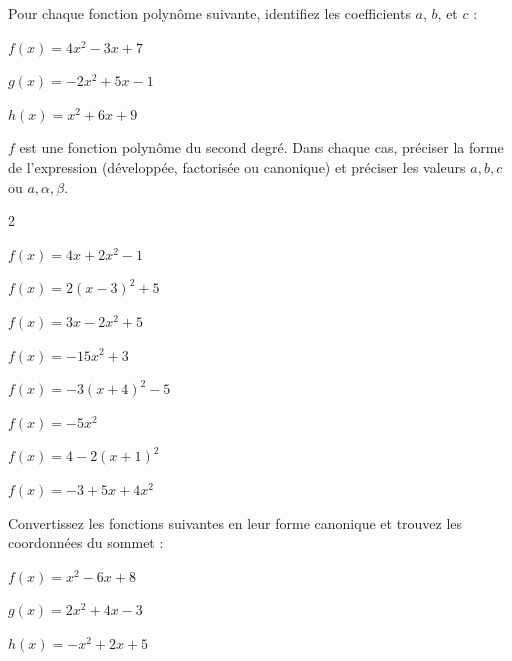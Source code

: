 \documentclass[11pt,a4paper]{article}  %
\begin{document}
	\graphicspath{{images/}}
	
	\begin{center}
		
		
	\end{center}



Pour chaque fonction polynôme suivante, identifiez les coefficients \( a \), \( b \), et \( c \) :
\begin{enumMet}
	\item \( f(x) = 4x^2 - 3x + 7 \)
	\item \( g(x) = -2x^2 + 5x - 1 \)
	\item \( h(x) = x^2 + 6x + 9 \)
\end{enumMet}



$f$ est une fonction polynôme du second degré. Dans chaque cas, préciser la forme de l'expression (développée, factorisée ou canonique) et préciser les valeurs $a, b, c$ ou $a, \alpha, \beta$.
\begin{multicols}{2}
	\begin{enumMet}
		\item $f(x)=4 x+2 x^2-1$
		\item $f(x)=2(x-3)^2+5$
		\item $f(x)=3x-2x^2+5$
		\item $f(x)=-15 x^2+3$
		\item $f(x)=-3(x+4)^2-5$
		\item $f(x)=-5 x^2$
		\item $f(x)=4-2(x+1)^2$
		\item $f(x)=-3+5x+4x^2$
	\end{enumMet}
\end{multicols}
\vspace*{-0.3cm}

Convertissez les fonctions suivantes en leur forme canonique et trouvez les coordonnées du sommet :
\begin{enumMet}
	\item \( f(x) = x^2 - 6x + 8 \)
	\item \( g(x) = 2x^2 + 4x - 3 \)
	\item \( h(x) = -x^2 + 2x + 5 \)
\end{enumMet}
\end{document}
